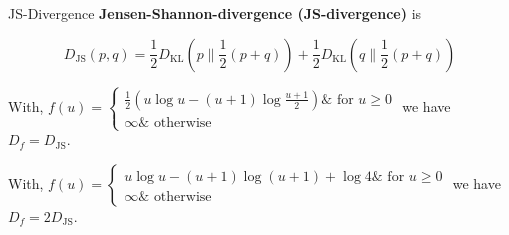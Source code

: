 \begin{frame}[allowframebreaks]

\begin{mydefinitionblock}{12.16}{JS-Divergence}
    \textbf{Jensen-Shannon-divergence (JS-divergence)} is

    $$
    D_{\mathrm{JS}}(p, q)=\frac{1}{2} D_{\mathrm{KL}}\left(p \| \frac{1}{2}(p+q)\right)+\frac{1}{2} D_{\mathrm{KL}}\left(q \| \frac{1}{2}(p+q)\right)
    $$

    With, $f(u)=\left\{\begin{array}{ll}\frac{1}{2}\left(u \log u-(u+1) \log \frac{u+1}{2}\right) \& \text { for } u \geq 0 \\ \infty \& \text { otherwise }\end{array}\right.$ we have $D_{f}=D_{\mathrm{JS}}$.

    With, $f(u)=\left\{\begin{array}{ll}u \log u-(u+1) \log (u+1)+\log 4 \& \text { for } u \geq 0 \\ \infty \& \text { otherwise }\end{array}\right.$ we have $D_{f}=2 D_{\mathrm{JS}}$.
\end{mydefinitionblock}

\end{frame}

